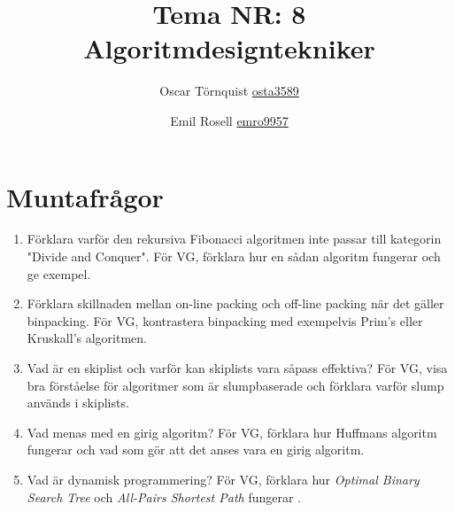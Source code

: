 \documentclass[a5paper,10pt,oneside]{article}
\title{Tema NR: 8 Algoritmdesigntekniker}
\author{Oscar Törnquist \url{osta3589} \and Emil Rosell \url{emro9957}}
\begin{document}
\maketitle

\section*{Muntafrågor}
\begin{enumerate}
\item Förklara varför den rekursiva Fibonacci algoritmen inte passar till kategorin "Divide and Conquer". För VG, förklara hur en sådan algoritm fungerar och ge exempel.

\item Förklara skillnaden mellan on-line packing och off-line packing när det gäller binpacking. För VG, kontrastera binpacking med exempelvis Prim's eller Kruskall's algoritmen.

\item Vad är en skiplist och varför kan skiplists vara såpass effektiva? För VG, visa bra förståelse för algoritmer som är slumpbaserade och förklara varför slump används i skiplists.
\item
Vad menas med en girig algoritm? För VG, förklara hur Huffmans algoritm fungerar och vad som gör att det anses vara en girig algoritm.
\item
Vad är dynamisk programmering? För VG, förklara hur \textit{Optimal Binary Search Tree} och \textit{All-Pairs Shortest Path} fungerar . 


\end{enumerate}
\end{document}
